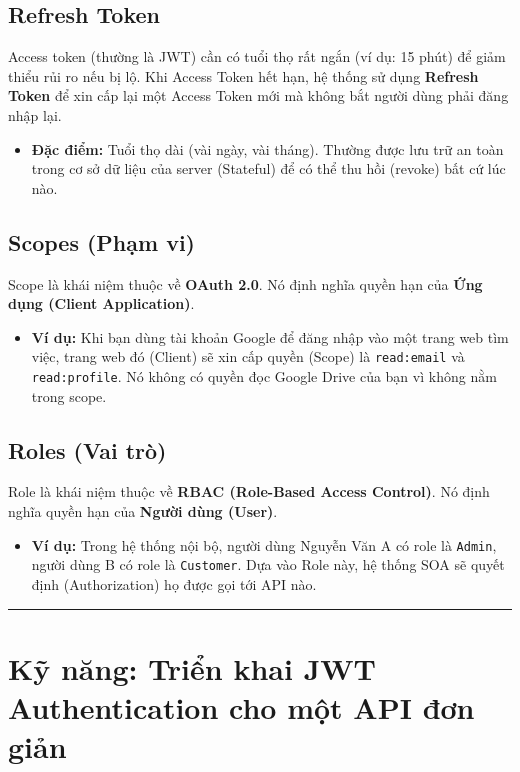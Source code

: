 \documentclass[12pt,a4paper]{article}
\begin{document}
\subsection{Refresh Token}
Access token (thường là JWT) cần có tuổi thọ rất ngắn (ví dụ: 15 phút) để giảm thiểu rủi ro nếu bị lộ. Khi Access Token hết hạn, hệ thống sử dụng \textbf{Refresh Token} để xin cấp lại một Access Token mới mà không bắt người dùng phải đăng nhập lại.
\begin{itemize}
    \item \textbf{Đặc điểm:} Tuổi thọ dài (vài ngày, vài tháng). Thường được lưu trữ an toàn trong cơ sở dữ liệu của server (Stateful) để có thể thu hồi (revoke) bất cứ lúc nào.
\end{itemize}

\subsection{Scopes (Phạm vi)}
Scope là khái niệm thuộc về \textbf{OAuth 2.0}. Nó định nghĩa quyền hạn của \textbf{Ứng dụng (Client Application)}.
\begin{itemize}
    \item \textbf{Ví dụ:} Khi bạn dùng tài khoản Google để đăng nhập vào một trang web tìm việc, trang web đó (Client) sẽ xin cấp quyền (Scope) là \texttt{read:email} và \texttt{read:profile}. Nó không có quyền đọc Google Drive của bạn vì không nằm trong scope.
\end{itemize}

\subsection{Roles (Vai trò)}
Role là khái niệm thuộc về \textbf{RBAC (Role-Based Access Control)}. Nó định nghĩa quyền hạn của \textbf{Người dùng (User)}.
\begin{itemize}
    \item \textbf{Ví dụ:} Trong hệ thống nội bộ, người dùng Nguyễn Văn A có role là \texttt{Admin}, người dùng B có role là \texttt{Customer}. Dựa vào Role này, hệ thống SOA sẽ quyết định (Authorization) họ được gọi tới API nào.
\end{itemize}

\vspace{0.5cm}
\hrule
\vspace{0.5cm}

\section{Kỹ năng: Triển khai JWT Authentication cho một API đơn giản}
\end{document}
